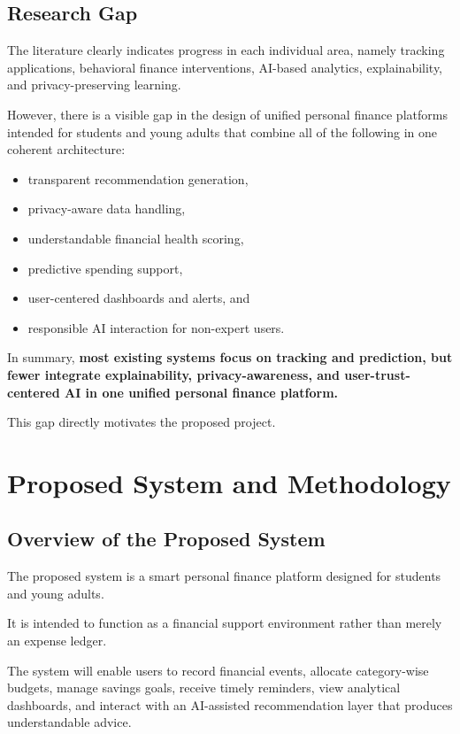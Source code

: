\documentclass[12pt,a4paper]{report}
\begin{document}
\section{Research Gap}
The literature clearly indicates progress in each individual area,
namely tracking applications,
behavioral finance interventions,
AI-based analytics,
explainability,
and privacy-preserving learning.

However,
there is a visible gap in the design of unified personal finance platforms intended for students and young adults that combine all of the following in one coherent architecture:
\begin{itemize}[leftmargin=2em]
\item transparent recommendation generation,
\item privacy-aware data handling,
\item understandable financial health scoring,
\item predictive spending support,
\item user-centered dashboards and alerts,
and
\item responsible AI interaction for non-expert users.
\end{itemize}

In summary,
\textbf{most existing systems focus on tracking and prediction,
but fewer integrate explainability,
privacy-awareness,
and user-trust-centered AI in one unified personal finance platform.}

This gap directly motivates the proposed project.

\chapter{Proposed System and Methodology}

\section{Overview of the Proposed System}
The proposed system is a smart personal finance platform designed for students and young adults.

It is intended to function as a financial support environment rather than merely an expense ledger.

The system will enable users to record financial events,
allocate category-wise budgets,
manage savings goals,
receive timely reminders,
view analytical dashboards,
and interact with an AI-assisted recommendation layer that produces understandable advice.
\end{document}
